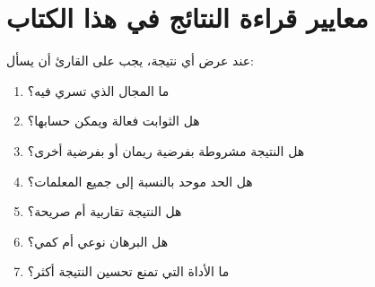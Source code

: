 \begin{antfigure}
\caption{خريطة اعتماد مبسّطة بين أجزاء الموسوعة الستة والعشرين فصلًا،
مطابقة لتقسيم الأجزاء الفعلي في الفهرس: الأسس تُبنى أولًا، ثم زيتا ودوال
\(L\)، ثم توزيع الأعداد الأولية، ثم يتفرع الكتاب إلى مسارين متوازيين
(الغربال/الطريقة الدائرية من جهة، والطيف الآلي من جهة أخرى) يلتقيان في
الجبهات البحثية الحديثة. الأسهم تشير إلى اعتماد لاحق على سابق، لا إلى
ترتيب قراءة إلزامي وحيد.}
\label{fig:chapter-dependency-map}
\end{antfigure}

\section{معايير قراءة النتائج في هذا الكتاب}

عند عرض أي نتيجة، يجب على القارئ أن يسأل:

\begin{enumerate}
  \item ما المجال الذي تسري فيه؟
  \item هل الثوابت فعالة ويمكن حسابها؟
  \item هل النتيجة مشروطة بفرضية ريمان أو بفرضية أخرى؟
  \item هل الحد موحد بالنسبة إلى جميع المعلمات؟
  \item هل النتيجة تقاربية أم صريحة؟
  \item هل البرهان نوعي أم كمي؟
  \item ما الأداة التي تمنع تحسين النتيجة أكثر؟
\end{enumerate}

